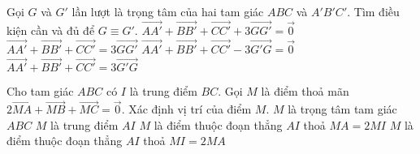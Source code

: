 \begin{ex}%
	Gọi $G$ và $G'$ lần lượt là trọng tâm của hai tam giác $ABC$ và $A'B'C'$. Tìm điều kiện cần và đủ để $G \equiv G'$.
	\choice
	{$\overrightarrow{AA'}+\overrightarrow{BB'}+\overrightarrow{CC'}+3\overrightarrow{GG'}=\overrightarrow{0}$}
	{$\overrightarrow{AA'}+\overrightarrow{BB'}+\overrightarrow{CC'}=3\overrightarrow{GG'}$}
	{$\overrightarrow{AA'}+\overrightarrow{BB'}+\overrightarrow{CC'}-3\overrightarrow{G'G}=\overrightarrow{0}$}
	{\True  $\overrightarrow{AA'}+\overrightarrow{BB'}+\overrightarrow{CC'}=3\overrightarrow{G'G}$}
\end{ex}

\begin{ex}%
	Cho tam giác $ABC$ có $I$ là trung điểm $BC$. Gọi $M$ là điểm thoả mãn \break $2\overrightarrow{MA}+\overrightarrow{MB}+\overrightarrow{MC}=\overrightarrow{0}$. Xác định vị trí của điểm $M$.
	\choice
	{$M$ là trọng tâm tam giác $ABC$}
	{\True $M$ là trung điểm $AI$}
	{$M$ là điểm thuộc đoạn thẳng $AI$ thoả $MA=2MI$}
	{$M$ là điểm thuộc đoạn thẳng $AI$ thoả $MI=2MA$}
\end{ex}

